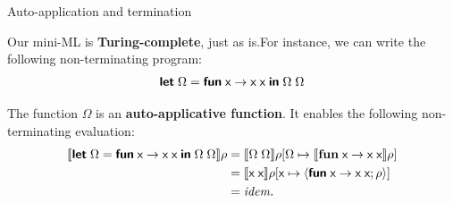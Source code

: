 %
\begin{frame}[fragile]{Auto-application and termination}

  Our mini-ML is \textbf{Turing\hyp{}complete}, just as \OCaml is.For
  instance, we can write the following non\hyp{}terminating program:
  {\setlength{\abovedisplayskip}{0pt}
    \setlength{\belowdisplayskip}{2pt}
    \begin{equation*}
      \textsf{\textbf{let}} \; \Omega = \textsf{\textbf{fun}} \; \textsf{x} \rightarrow \textsf{x} \;
      \textsf{x} \; \textsf{\textbf{in}} \; \Omega \; \Omega
  \end{equation*}}

  The function $\Omega$ is an \textbf{auto\hyp{}applicative function}.
  It enables the following non\hyp{}terminating evaluation:
  \begin{align*}
     \evalf{\Xlet \; \Omega = \Xfun \; \ident{x} \rightarrow \ident{x} \; \ident{x} \; \Xin \; \Omega \; \Omega}{\rho}
     &= \evalf{\Omega \; \Omega}%
           {\extend{\rho}{\Omega}{\evalf{\textbf{fun}\; \ident{x} \rightarrow \ident{x} \; \ident{x}}{\rho}}}\\
   &= \evalf{\ident{x} \; \ident{x}}{\extend{\rho}{\ident{x}}{\clos{\ident{x}}{\ident{x} \; \ident{x}}{\rho}}}\\
   &= \text{\emph{idem.}}
  \end{align*}


\end{frame}

